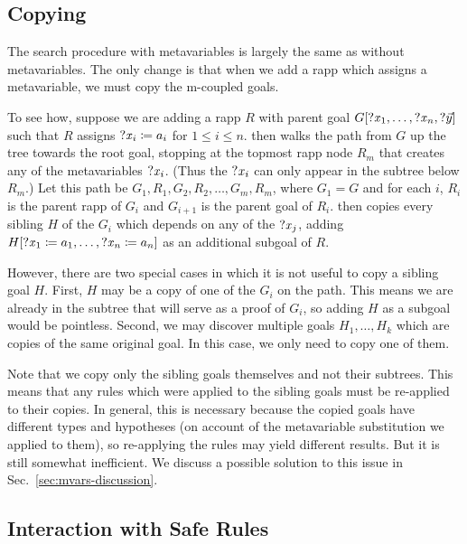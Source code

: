 \subsection{Copying}%
\label{sec:mvars-copying}

The search procedure with metavariables is largely the same as without metavariables.
The only change is that when we add a rapp which assigns a metavariable, we must copy the m-coupled goals.

To see how, suppose we are adding a rapp $R$ with parent goal $G[\mathit{?x}_{1},\dots,\mathit{?x}_{n},?\vec{y}]$ such that $R$ assigns $\mathit{?x}_{i} \coloneqq a_{i}$ for $1 ≤ i ≤ n$.
\Aesop{} then walks the path from $G$ up the tree towards the root goal, stopping at the topmost rapp node $R_{m}$ that creates any of the metavariables $\mathit{?x}_{i}$.
(Thus the $\mathit{?x}_{i}$ can only appear in the subtree below $R_{m}$.)
Let this path be $G_{1}, R_{1}, G_{2}, R_{2}, \dots, G_{m}, R_{m}$, where $G_{1} = G$ and for each $i$, $R_{i}$ is the parent rapp of $G_{i}$ and $G_{i+1}$ is the parent goal of $R_{i}$.
\Aesop{} then copies every sibling $H$ of the $G_{i}$ which depends on any of the $\mathit{?x}_{j}$, adding $H[\mathit{?x}_{1} \coloneqq a_{1},\dots,\mathit{?x}_{n} \coloneqq a_{n}]$ as an additional subgoal of $R$.

However, there are two special cases in which it is not useful to copy a sibling goal $H$.
First, $H$ may be a copy of one of the $G_{i}$ on the path.
This means we are already in the subtree that will serve as a proof of $G_{i}$, so adding $H$ as a subgoal would be pointless.
Second, we may discover multiple goals $H_{1}, \dots, H_{k}$ which are copies of the same original goal.
In this case, we only need to copy one of them.

Note that we copy only the sibling goals themselves and not their subtrees.
This means that any rules which were applied to the sibling goals must be re-applied to their copies.
In general, this is necessary because the copied goals have different types and hypotheses (on account of the metavariable substitution we applied to them), so re-applying the rules may yield different results.
But it is still somewhat inefficient.
We discuss a possible solution to this issue in Sec.~\ref{sec:mvars-discussion}.


\subsection{Interaction with Safe Rules}%
\label{sec:mvars-safe}

